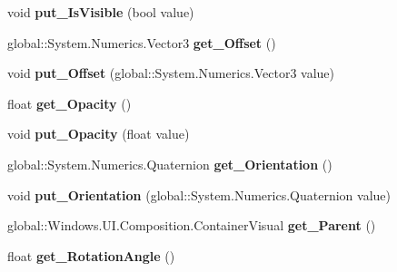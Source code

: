 \begin{DoxyCompactItemize}
void {\bfseries put\+\_\+\+Is\+Visible} (bool value)
\item 
\mbox{\label{interface_windows_1_1_u_i_1_1_composition_1_1_i_visual_aa330691d0b439cb6f52bd0f8ee1acc4f}} 
global\+::\+System.\+Numerics.\+Vector3 {\bfseries get\+\_\+\+Offset} ()
\item 
\mbox{\label{interface_windows_1_1_u_i_1_1_composition_1_1_i_visual_ab591b5dd5dce0a9cdfa72e957ce3731e}} 
void {\bfseries put\+\_\+\+Offset} (global\+::\+System.\+Numerics.\+Vector3 value)
\item 
\mbox{\label{interface_windows_1_1_u_i_1_1_composition_1_1_i_visual_ac8734d1872440f36e957ad510227446a}} 
float {\bfseries get\+\_\+\+Opacity} ()
\item 
\mbox{\label{interface_windows_1_1_u_i_1_1_composition_1_1_i_visual_ad61a737c8ccc4148e0134f10292f5708}} 
void {\bfseries put\+\_\+\+Opacity} (float value)
\item 
\mbox{\label{interface_windows_1_1_u_i_1_1_composition_1_1_i_visual_a523dd4814f2f36f236cfe45314be2dd0}} 
global\+::\+System.\+Numerics.\+Quaternion {\bfseries get\+\_\+\+Orientation} ()
\item 
\mbox{\label{interface_windows_1_1_u_i_1_1_composition_1_1_i_visual_ac0ab83605b6773e888073ad16337ad3f}} 
void {\bfseries put\+\_\+\+Orientation} (global\+::\+System.\+Numerics.\+Quaternion value)
\item 
\mbox{\label{interface_windows_1_1_u_i_1_1_composition_1_1_i_visual_a134bed2c4c5639f5afd9a8ea755bd39a}} 
global\+::\+Windows.\+U\+I.\+Composition.\+Container\+Visual {\bfseries get\+\_\+\+Parent} ()
\item 
\mbox{\label{interface_windows_1_1_u_i_1_1_composition_1_1_i_visual_abefcdbefc02e45c1a846f29a0b173f5d}} 
float {\bfseries get\+\_\+\+Rotation\+Angle} ()

\end{DoxyCompactItemize}
